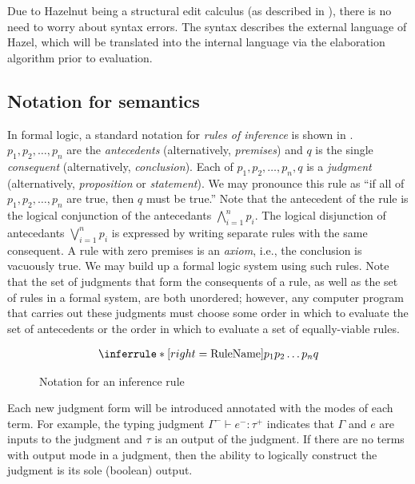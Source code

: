 Due to Hazelnut being a structural edit calculus (as described in ), there is no need to worry about syntax errors. The syntax describes the external language of Hazel, which will be translated into the internal language via the elaboration algorithm prior to evaluation.

\subsection{Notation for semantics}
\label{sec:semantics-notation}
In formal logic, a standard notation for \textit{rules of inference} is shown in . $p_1,p_2,\dots,p_n$ are the \textit{antecedents} (alternatively, \textit{premises}) and $q$ is the single \textit{consequent} (alternatively, \textit{conclusion}). Each of $p_1,p_2,\dots,p_n,q$ is a \textit{judgment} (alternatively, \textit{proposition} or \textit{statement}). We may pronounce this rule as ``if all of $p_1,p_2,\dots,p_n$ are true, then $q$ must be true.'' Note that the antecedent of the rule is the logical conjunction of the antecedants $\bigwedge_{i=1}^n p_i$. The logical disjunction of antecedants $\bigvee_{i=1}^n p_i$ is expressed by writing separate rules with the same consequent. A rule with zero premises is an \textit{axiom}, i.e., the conclusion is vacuously true. We may build up a formal logic system using such rules. Note that the set of judgments that form the consequents of a rule, as well as the set of rules in a formal system, are both unordered; however, any computer program that carries out these judgments must choose some order in which to evaluate the set of antecedents or the order in which to evaluate a set of equally-viable rules.

\begin{figure}
  \centering
  \begin{mdframed}
    \begin{singlespace}
      \begin{equation*}
        \Infer{RuleName}{p_1 \\ p_2 \\ \dots \\ p_n}{q}
      \end{equation*}
    \end{singlespace}
  \end{mdframed}
  \caption{Notation for an inference rule}
  \label{fig:sample-inference-rule}
\end{figure}

Each new judgment form will be introduced annotated with the modes of each term. For example, the typing judgment $\Gamma^-\vdash e^-:\tau^+$ indicates that $\Gamma$ and $e$ are inputs to the judgment and $\tau$ is an output of the judgment. If there are no terms with output mode in a judgment, then the ability to logically construct the judgment is its sole (boolean) output.

